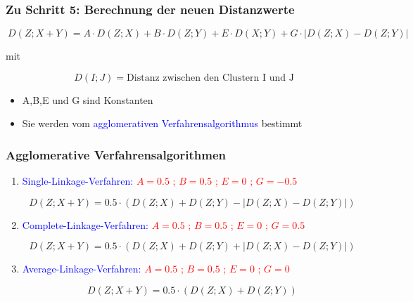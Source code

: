 \documentclass{beamer}
\begin{document}
\begin{frame}
 \frametitle{Zu Schritt 5: Berechnung der neuen Distanzwerte}

 \begin{equation*}
  \ D(Z;X+Y)=A\cdot D(Z;X)+B\cdot D(Z;Y)+E\cdot D(X;Y)+G\cdot |D(Z;X)-D(Z;Y)|
 \end{equation*}

 mit

 \begin{equation*}
  \ D(I;J)=\text{Distanz zwischen den Clustern I und J}
 \end{equation*}

 \begin{itemize}
  \item A,B,E und G sind Konstanten
  \item Sie werden vom \textcolor{blue}{agglomerativen Verfahrensalgorithmus} bestimmt
 \end{itemize}

\end{frame}

\begin{frame}
 \frametitle{Agglomerative Verfahrensalgorithmen}

 \begin{enumerate}
  \item \textcolor{blue}{Single-Linkage-Verfahren:} \textcolor{red}{$A=0.5$ ; $B=0.5$ ; $E=0$ ; $G=-0.5$}   %

  \begin{equation}
   \ D(Z;X+Y)=0.5\cdot (D(Z;X)+D(Z;Y)-|D(Z;X)-D(Z;Y)|)
  \end{equation}

  \item \textcolor{blue}{Complete-Linkage-Verfahren:} \textcolor{red}{$A=0.5$ ; $B=0.5$ ; $E=0$ ; $G=0.5$}  %

  \begin{equation}
   \ D(Z;X+Y)=0.5\cdot (D(Z;X)+D(Z;Y)+|D(Z;X)-D(Z;Y)|)
  \end{equation}

  \item \textcolor{blue}{Average-Linkage-Verfahren:} \textcolor{red}{$A=0.5$ ; $B=0.5$ ; $E=0$ ; $G=0$} 

  \begin{equation}
   \ D(Z;X+Y)=0.5\cdot (D(Z;X)+D(Z;Y))
  \end{equation}

 \end{enumerate}


\end{frame}
\end{document}
